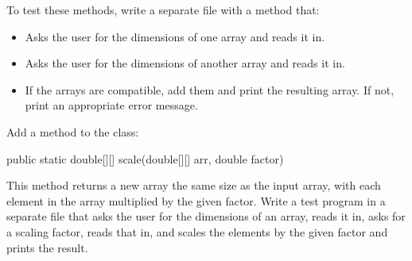 \begin{exercise}
To test these methods, write a separate file with a  method that:

\begin{itemize}
\item Asks the user for the dimensions of one array and reads it in.
\item Asks the user for the dimensions of another array and reads it in.
\item If the arrays are compatible, add them and print the resulting array. If not, print an appropriate error message.
\end{itemize}

\end{exercise}

\begin{exercise}
Add a method to the  class:

\begin{code}
public static double[][] scale(double[][] arr, double factor)
\end{code}

This method returns a new array the same size as the input array, with each element in the array multiplied by the given factor. Write a test program in a separate file that asks the user for the dimensions of an array, reads it in, asks for a scaling factor, reads that in, and scales the elements by the given factor and prints the result.
\end{exercise}

